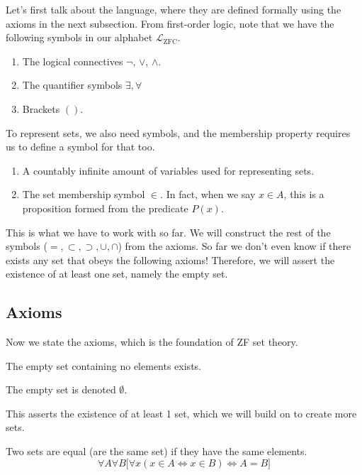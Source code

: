 \documentclass{article}
\begin{document}
    Let's first talk about the language, where they are defined formally using the axioms in the next subsection. From first-order logic, note that we have the following symbols in our alphabet $\mathcal{L}_{\mathrm{ZFC}}$. 
    \begin{enumerate}
      \item The logical connectives $\neg$, $\lor$, $\land$. 
      \item The quantifier symbols $\exists, \forall$ 
      \item Brackets $()$. 
    \end{enumerate}
    To represent sets, we also need symbols, and the membership property requires us to define a symbol for that too. 
    \begin{enumerate}
      \item A countably infinite amount of variables used for representing sets. 
      \item The set membership symbol $\in$. In fact, when we say $x \in A$, this is a proposition formed from the predicate $P(x)$. 
    \end{enumerate} 
    This is what we have to work with so far. We will construct the rest of the symbols ($=, \subset, \supset, \cup, \cap$) from the axioms. So far we don't even know if there exists any set that obeys the following axioms! Therefore, we will assert the existence of at least one set, namely the empty set. 

  \subsection{Axioms}

    Now we state the axioms, which is the foundation of ZF set theory. 

    \begin{axiom}
      The empty set containing no elements exists. 
    \end{axiom}

    \begin{definition}
      The empty set is denoted $\emptyset$. 
    \end{definition}

    This asserts the existence of at least 1 set, which we will build on to create more sets. 

    \begin{axiom}
      Two sets are equal (are the same set) if they have the same elements. 
      \begin{equation}
        \forall A \forall B \big[ \forall x (x \in A \iff x \in B) \iff A = B\big]
      \end{equation}
    \end{axiom} 
\end{document}
